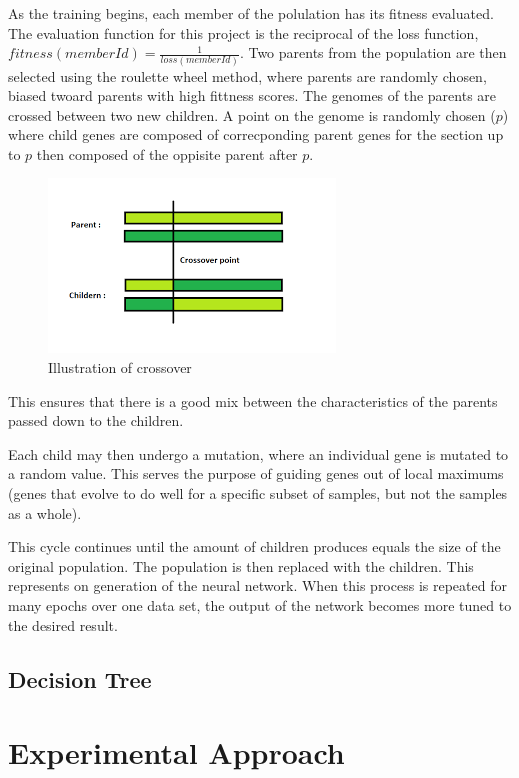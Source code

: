 \documentclass[12pt]{article}
\begin{document}
        As the training begins, each member of the polulation has its fitness evaluated.  The evaluation function for this project
        is the reciprocal of the loss function, \(fitness(memberId) = \frac{1}{loss(memberId)}\).  Two parents from the population
        are then selected using the roulette wheel method, where parents are randomly chosen, biased twoard parents with high fittness scores.
        The genomes of the parents are crossed between two new children.  A point on the genome is randomly chosen (\(p\)) where
        child genes are composed of correcponding parent genes for the section up to \(p\) then composed of the oppisite parent after \(p\).
        \begin{figure}[h]
            \includegraphics[scale=.5]{crossover.png}
            \centering
            \caption{Illustration of crossover}
        \end{figure}
        This ensures that there is a good mix between the characteristics of the parents passed down to the children.

        Each child may then undergo a mutation, where an individual gene is mutated to a random value.  This serves the
        purpose of guiding genes out of local maximums (genes that evolve to do well for a specific subset of samples, but
        not the samples as a whole).
        
        This cycle continues until the amount of children produces equals the size of the original population.  The population
        is then replaced with the children.  This represents on generation of the neural network.
        When this process is repeated for many epochs over one data set, the output of the network becomes more
        tuned to the desired result.
        \subsection{Decision Tree}
\section{Experimental Approach}
\end{document}
